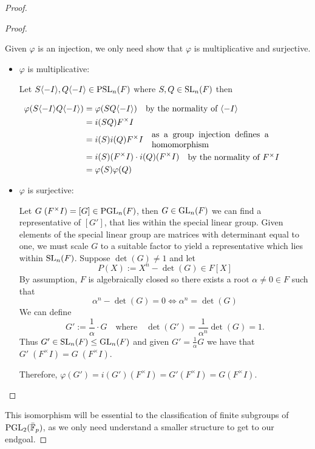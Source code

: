 \begin{proof}
\begin{proof}
\begin{itemize}
Given $\varphi$ is an injection, we only need show that $\varphi$ is multiplicative and surjective.
\begin{itemize}
    \item $\varphi$ is multiplicative:

    Let $S \langle-I\rangle, Q\langle-I\rangle \in \operatorname{PSL}_n(F)$ where $S, Q \in \operatorname{SL}_n(F)$ then

    \begin{align*}
    \varphi(S \langle-I\rangle  Q\langle-I\rangle ) &= \varphi(SQ \langle -I\rangle) \quad \parbox[c]{0.4\linewidth}{by the normality of $\langle -I \rangle$}\\
    &= i(SQ) F^\times I\\
    &= i(S) i(Q) F^\times I \quad  \parbox[c]{0.4\linewidth}{as a group injection defines a homomorphism}\\
    &= i(S) (F^\times I) \cdot i(Q)(F^\times I) \quad \parbox[c] {0.4\linewidth}{ by the normality of $F^\times I$}\\
    &= \varphi(S) \varphi(Q)
    \end{align*}
    
    \item $\varphi$ is surjective:

    Let $G \; (F^\times I) = [G] \in \operatorname{PGL}_n(F)$, then $G \in \operatorname{GL}_n(F)$ we can find a representative of $[G']$, that lies within the special linear group.
    Given elements of the special linear group are matrices with determinant equal to one, we must scale $G$ to a suitable factor to yield a representative which lies within $\operatorname{SL}_n(F)$. Suppose $\det(G) \ne 1$ and let
    \[
    P(X) := X^n - \det(G) \in F[X]
    \]
    By assumption, $F$ is algebraically closed so there exists a root $\alpha \ne 0\in F$ such that 
    \[
    \alpha^n - \det(G) = 0 \iff \alpha^n = \det(G)
    \]
    We can define
    \[
    G' := \frac{1}{\alpha} \cdot G \quad \text{where} \quad \det(G') = \frac{1}{\alpha^n} \det(G) = 1.
    \]
    Thus $G' \in \operatorname{SL}_n(F) \leq \operatorname{GL}_n(F)$ and given $G' = \frac{1}{\alpha} G$ we have that $G'  \; (F^\times I) = G \; (F^\times I)$.
    
    Therefore, $\varphi(G') = i(G') (F^\times I) = G' (F^\times I) = G (F^\times I)$.
\end{itemize}


\end{itemize}

\end{proof}

This isomorphism will be essential to the classification of finite subgroups of $\operatorname{PGL}_2(\bar{\mathbb{F}}_p)$, as we only need understand a smaller structure to get to our endgoal.



\end{proof}

